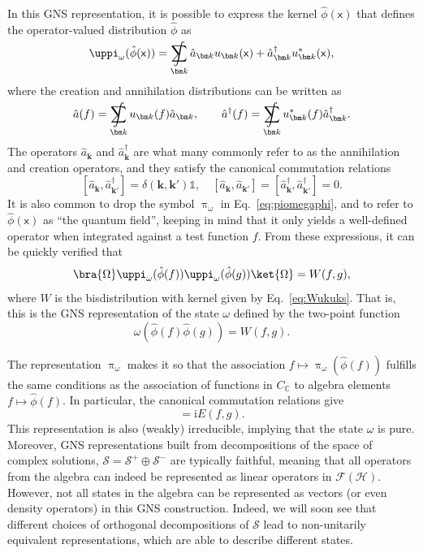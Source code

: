 \documentclass[letterpaper,12pt,titlepage,oneside,final]{book}
\newcommand{\openone}{\mathds{1}}
\renewcommand{\S}{\mathcal{S}}
\newcommand{\mf}{\mathsf}%
\newcommand{\ii}{\mathrm{i}}
\DeclareMathOperator*{\sumint}{%
\mathchoice%
  {\ooalign{$\displaystyle\sum$\cr\hidewidth$\displaystyle\int$\hidewidth\cr}}
  {\ooalign{\raisebox{.14\height}{\scalebox{.7}{$\textstyle\sum$}}\cr\hidewidth$\textstyle\int$\hidewidth\cr}}
  {\ooalign{\raisebox{.2\height}{\scalebox{.6}{$\scriptstyle\sum$}}\cr$\scriptstyle\int$\cr}}
  {\ooalign{\raisebox{.2\height}{\scalebox{.6}{$\scriptstyle\sum$}}\cr$\scriptstyle\int$\cr}}
}
\begin{document}
In this GNS representation, it is possible to express the kernel $\hat{\phi}(\mf x)$ that defines the operator-valued distribution $\hat{\phi}$ as
\begin{equation}\label{eq:piomegaphi}
    \uppi_\omega(\hat{\phi}(\mf x)) = \sumint_{\bm k} \hat{a}_{\bm k} u_{\bm k}(\mf x) + \hat{a}_{\bm k}^\dagger u_{\bm k}^*(\mf x),
\end{equation}
where the creation and annihilation distributions can be written as
\begin{align}
    \hat{a}(f) = \sumint_{\bm k} u_{\bm k}(f)\hat{a}_{\bm k},\quad \quad
    \hat{a}^\dagger(f) = \sumint_{\bm k} u_{\bm k}^*(f)\hat{a}_{\bm k}^\dagger.
\end{align}
The operators $\hat{a}_{\bm k}$ and $\hat{a}_{\bm k}^\dagger$ are what many commonly refer to as the annihilation and creation operators, and they satisfy the canonical commutation relations
\begin{equation}\label{eq:CCRakakd}
    [\hat{a}_{\bm k},\hat{a}^\dagger_{\bm k'}] = \delta(\bm k, \bm k')\openone, \quad 
    [\hat{a}_{\bm k},\hat{a}_{\bm k'}] = 
    [\hat{a}^\dagger_{\bm k},\hat{a}^\dagger_{\bm k'}] = 0.
\end{equation}
It is also common to drop the symbol $\uppi_\omega$ in Eq.~\eqref{eq:piomegaphi}, and to refer to $\hat{\phi}(\mf x)$ as ``the quantum field'', keeping in mind that it only yields a well-defined operator when integrated against a test function $f$. From these expressions, it can be quickly verified that
\begin{equation}
    \bra{\Omega}\uppi_\omega(\hat{\phi}(f))\uppi_\omega(\hat{\phi}(g))\ket{\Omega} = W(f,g),
\end{equation}
where $W$ is the bisdistribution with kernel given by Eq.~\eqref{eq:Wukuks}. That is, this is the GNS representation of the state $\omega$ defined by the two-point function
\begin{equation}
    \omega(\hat{\phi}(f)\hat{\phi}(g)) = W(f,g).
\end{equation}

The representation $\uppi_\omega$ makes it so that the association $f\mapsto \uppi_\omega(\hat{\phi}(f))$ fulfills the same conditions as the association of functions in $C_\mathbb{C}$ to algebra elements $f\mapsto \hat{\phi}(f)$. In particular, the canonical commutation relations give
\begin{equation}
    [\uppi_\omega(\hat{\phi}(f)),\uppi_\omega(\hat{\phi}(g))] = \ii E(f,g).
\end{equation}
This representation is also (weakly) irreducible, implying that the state $\omega$ is pure. Moreover, GNS representations built from decompositions of the space of complex solutions, $\S = \S^+\oplus\S^-$ are typically faithful, meaning that all operators from the algebra can indeed be represented as linear operators in $\mathcal{F}(\mathscr{H})$. However, not all states in the algebra can be represented as vectors (or even density operators) in this GNS construction. Indeed, we will soon see that different choices of orthogonal decompositions of $\S$ lead to non-unitarily equivalent representations, which are able to describe different states. 
\end{document}
